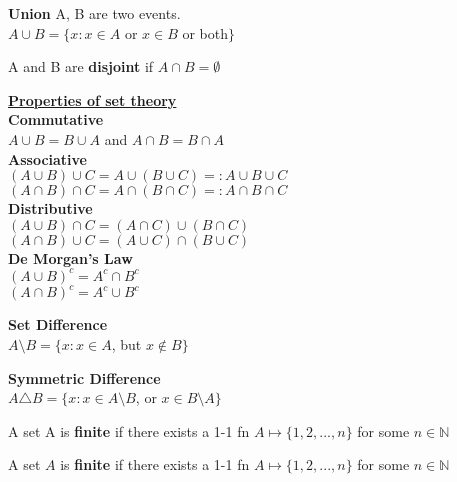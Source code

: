 \documentclass[14pt, oneside, letterpaper]{notes}
\begin{document}
\begin{mydef}
  \textbf{Union} A, B are two events. \\
  \indent $A \cup B = \{x: x \in A$ or $x \in B$ or both$\}$
\end{mydef}

\begin{mydef}
  A and B are \textbf{disjoint} if $A \cap B = \emptyset$
\end{mydef}

\noindent \underline{\textbf{Properties of set theory}}  \\
\textbf{Commutative}  \\
\indent $A \cup B = B \cup A$ and $A \cap B = B \cap A$ \\
\textbf{Associative}\\
\indent $(A \cup B) \cup C = A \cup (B \cup C) =: A \cup B \cup C$ \\
\indent $(A \cap B) \cap C = A \cap (B \cap C) =: A \cap B \cap C$ \\
\textbf{Distributive}\\
\indent $(A \cup B) \cap C = (A \cap C) \cup (B \cap C)$ \\
\indent $(A \cap B) \cup C = (A \cup C) \cap (B \cup C)$ \\
\textbf{De Morgan's Law}\\
\indent $(A \cup B)^c = A^c \cap B^c$ \\
\indent $(A \cap B)^c = A^c \cup B^c$ 

\begin{mydef}
  \textbf{Set Difference}\\
  \indent $A \setminus B = \{x: x \in A$, but $x \notin B \}$
\end{mydef}

\begin{mydef}
  \textbf{Symmetric Difference}\\
  \indent $A \triangle B = \{x: x \in A \setminus B$, or 
  $x \in B \setminus A \}$
\end{mydef}

\begin{mydef}
  A set A is \textbf{finite} if there exists a 1-1 fn $A \mapsto 
  \{ 1, 2, ..., n \}$ for some $n \in \mathbb{N}$
\end{mydef}

%
%

\begin{mydef}
  A set $A$ is \textbf{finite} if there exists a 1-1 fn $A \mapsto 
  \{ 1, 2, ..., n \}$ for some $n \in \mathbb{N}$
\end{mydef}
\end{document}
